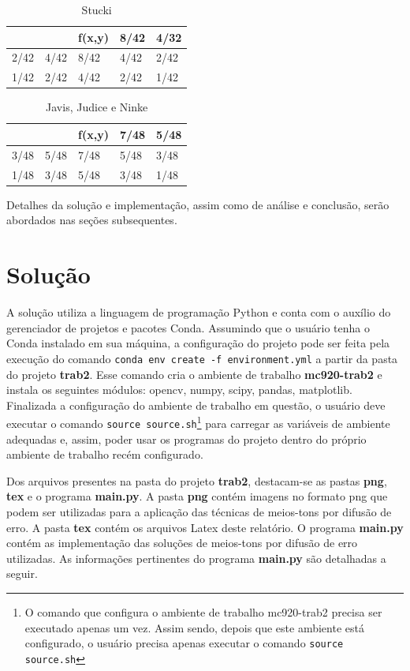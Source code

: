 \documentclass{article}
\begin{document}
\begin{table}[!h]
	\caption*{Stucki}
	\label{tab:stucki}
	\centering
	\begin{tabular}{|l|l|l|l|l|}
		\hline
		&      & f(x,y) & 8/42 & 4/32 \\ \hline
		2/42 & 4/42 & 8/42   & 4/42 & 2/42 \\ \hline
		1/42 & 2/42 & 4/42   & 2/42 & 1/42 \\ \hline
	\end{tabular}
\end{table}

\begin{table}[!h]
	\caption*{Javis, Judice e Ninke}
	\label{tab:javis}
	\centering
	\begin{tabular}{|l|l|l|l|l|}
		\hline
		&      & f(x,y) & 7/48 & 5/48 \\ \hline
		3/48 & 5/48 & 7/48   & 5/48 & 3/48 \\ \hline
		1/48 & 3/48 & 5/48   & 3/48 & 1/48 \\ \hline
	\end{tabular}
\end{table}

Detalhes da solução e implementação, assim como de análise e conclusão, serão abordados nas seções subsequentes.

%
\section{Solução}
A solução utiliza a linguagem de programação Python e conta com o auxílio do gerenciador de projetos e pacotes Conda. Assumindo que o usuário tenha o Conda instalado em sua máquina, a configuração do projeto pode ser feita pela execução do comando \lstinline{conda env create -f environment.yml} a partir da pasta do projeto \textbf{trab2}. Esse comando cria o ambiente de trabalho \textbf{mc920-trab2} e instala os seguintes módulos: opencv, numpy, scipy, pandas, matplotlib. Finalizada a configuração do ambiente de trabalho em questão, o usuário deve executar o comando \lstinline{source source.sh}\footnote{O comando que configura o ambiente de trabalho mc920-trab2 precisa ser executado apenas um vez. Assim sendo, depois que este ambiente está configurado, o usuário precisa apenas executar o comando \lstinline{source source.sh}} para carregar as variáveis de ambiente adequadas e, assim, poder usar os programas do projeto dentro do próprio ambiente de trabalho recém configurado. 

Dos arquivos presentes na pasta do projeto \textbf{trab2}, destacam-se as pastas \textbf{png}, \textbf{tex} e o programa \textbf{main.py}. A pasta \textbf{png} contém imagens no formato png que podem ser utilizadas para a aplicação das técnicas de meios-tons por difusão de erro. A pasta \textbf{tex} contém os arquivos Latex deste relatório. O programa \textbf{main.py} contém as implementação das soluções de meios-tons por difusão de erro utilizadas. As informações pertinentes do programa \textbf{main.py} são detalhadas a seguir.
\end{document}
